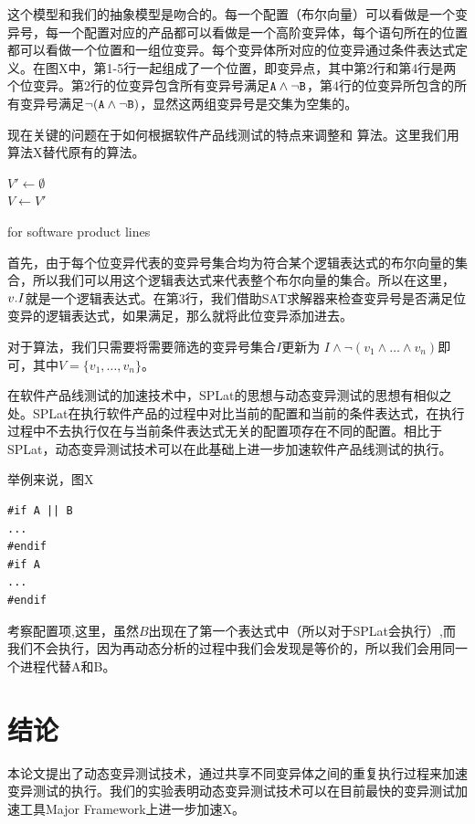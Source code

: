 \documentclass[nofonts]{ctexrep}
\begin{document}
这个模型和我们的抽象模型是吻合的。每一个配置（布尔向量）可以看做是一个变异号，每一个配置对应的产品都可以看做是一个高阶变异体，每个语句所在的位置都可以看做一个位置和一组位变异。每个变异体所对应的位变异通过条件表达式定义。在图X中，第1-5行一起组成了一个位置，即变异点，其中第2行和第4行是两个位变异。第2行的位变异包含所有变异号满足$\tt A \wedge \neg B$，第4行的位变异所包含的所有变异号满足$\tt \neg (A \wedge \neg B)$，显然这两组变异号是交集为空集的。

现在关键的问题在于如何根据软件产品线测试的特点来调整\filterv 和 \filterm 算法。这里我们用算法X替代原有的\filterv 算法。

\begin{algorithm}
  $V' \leftarrow \emptyset$\\
  $V \leftarrow V'$  
\caption{\filterv for software product lines}
\label{alg:spl}
\end{algorithm}

首先，由于每个位变异代表的变异号集合均为符合某个逻辑表达式的布尔向量的集合，所以我们可以用这个逻辑表达式来代表整个布尔向量的集合。所以在这里，$v.I$就是一个逻辑表达式。在第3行，我们借助SAT求解器来检查变异号是否满足位变异的逻辑表达式，如果满足，那么就将此位变异添加进去。

对于\filterm 算法，我们只需要将需要筛选的变异号集合$I$更新为 $I \wedge \neg(v_1 \wedge \ldots \wedge v_n)$即可，其中$V = \{v_1,
\ldots, v_n\}$。

在软件产品线测试的加速技术中，SPLat的思想与动态变异测试的思想有相似之处。SPLat在执行软件产品的过程中对比当前的配置和当前的条件表达式，在执行过程中不去执行仅在与当前条件表达式无关的配置项存在不同的配置。相比于SPLat，动态变异测试技术可以在此基础上进一步加速软件产品线测试的执行。

举例来说，图X

\begin{verbatim}
#if A || B
...
#endif
#if A 
...
#endif
\end{verbatim}

考察配置项,这里，虽然$B$出现在了第一个表达式中（所以对于SPLat会执行）,而我们不会执行，因为再动态分析的过程中我们会发现是等价的，所以我们会用同一个进程代替A和B。


\chapter{结论}
本论文提出了动态变异测试技术，通过共享不同变异体之间的重复执行过程来加速变异测试的执行。我们的实验表明动态变异测试技术可以在目前最快的变异测试加速工具Major Framework上进一步加速X。
\end{document}
